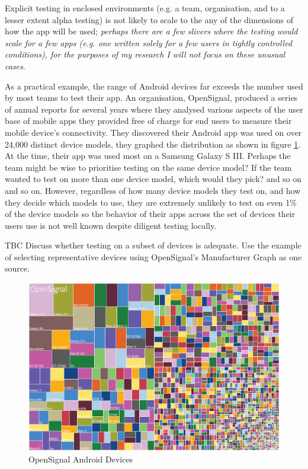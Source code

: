 Explicit testing in enclosed environments (e.g. a team, organisation, and to a lesser extent alpha testing) is not likely to scale to the any of the dimensions of how the app will be used; \textit{perhaps there are a few slivers where the testing would scale for a few apps (e.g. one written solely for a few users in tightly controlled conditions), for the purposes of my research I will not focus on these unusual cases}. 

As a practical example, the range of Android devices far exceeds the number used by most teams to test their app. An organisation,  OpenSignal, produced a series of annual reports for several years where they analysed various aspects of the user base of mobile apps they provided free of charge for end users to measure their mobile device's connectivity. They discovered their Android app was used on over 24,000 distinct device models, %
they graphed the distribution as shown in figure \ref{fig:opensignal_devices}. At the time, their app was used most on a Samsung Galaxy S III. Perhaps the team might be wise to prioritise testing on the same device model? If the team wanted to test on more than one device model, which would they pick? and so on and so on. However, regardless of how many device models they test on, and how they decide which models to use, they are extremely unlikely to test on even 1\% of the device models so the behavior of their apps across the set of devices their users use is not well known despite diligent testing locally.

TBC Discuss whether testing on a subset of devices is adequate. Use the example of selecting representative devices using OpenSignal's Manufacturer Graph as one source.

\begin{figure}
    \centering
    \includegraphics[angle=90,origin=c, width=\textwidth,height=\textheight,keepaspectratio]{images/opensignal-android-devices-matrix.png}
    \caption{OpenSignal Android Devices}
    \label{fig:opensignal_devices}
\end{figure}

